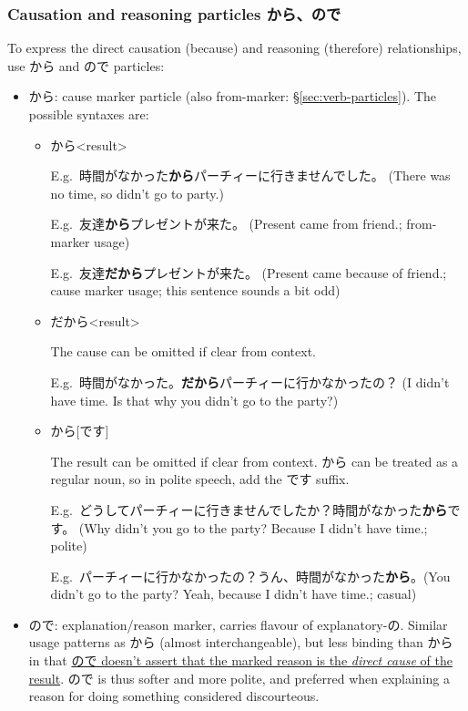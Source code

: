 \documentclass[../nihongo-gakushuu-kyouzai.tex]{subfiles}
\begin{document}
\subsubsection{Causation and reasoning particles から、ので} \label{sec:causation-reasoning-particles}
To express the direct causation (because) and reasoning (therefore) relationships, use から and ので particles:
\begin{itemize}
    \item から: cause marker particle (also from-marker: \S\ref{sec:verb-particles}). The possible syntaxes are:
    \begin{itemize}
        \item <direct cause>[だ]から<result>


        E.g.\ 時間がなかった\textbf{から}パーチィーに行きませんでした。 (There was no time, so didn't go to party.)

        E.g.\ 友達\textbf{から}プレゼントが来た。 (Present came from friend.; from-marker usage)

        E.g.\ 友達\textbf{だから}プレゼントが来た。 (Present came because of friend.; cause marker usage; this sentence sounds a bit odd)

        \item{} だから<result>

        The cause can be omitted if clear from context. 

        E.g.\ 時間がなかった。\textbf{だから}パーチィーに行かなかったの？ (I didn't have time. Is that why you didn't go to the party?)
        \item <direct cause>[だ]から[です]

        The result can be omitted if clear from context. から can be treated as a regular noun, so in polite speech, add the です suffix.

        E.g.\ どうしてパーチィーに行きませんでしたか？時間がなかった\textbf{から}です。 (Why didn't you go to the party? Because I didn't have time.; polite)

        E.g.\ パーチィーに行かなかったの？うん、時間がなかった\textbf{から}。(You didn't go to the party? Yeah, because I didn't have time.; casual)
    \end{itemize}
    \item ので: explanation/reason marker, carries flavour of explanatory-の. Similar usage patterns as から (almost interchangeable), but less binding than から in that \ul{ので doesn't assert that the marked reason is the \emph{direct cause} of the result}. ので is thus softer and more polite, and preferred when explaining a reason for doing something considered discourteous.


\end{itemize}
\end{document}
